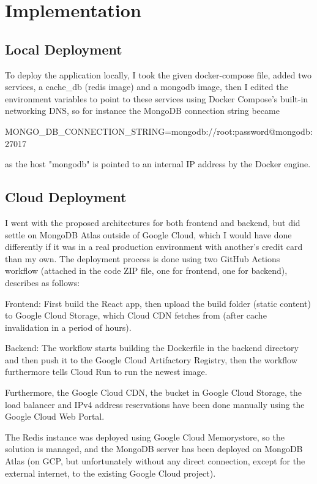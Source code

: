 \documentclass[11pt]{article}
\begin{document}
\section{Implementation}

\subsection{Local Deployment}
To deploy the application locally, I took the given docker-compose file, added two services, a cache\_db (redis image) and a mongodb image, then I edited the environment variables to point to these services using Docker Compose's built-in networking DNS, so for instance the MongoDB connection string became \begin{verbatim*}
	MONGO_DB_CONNECTION_STRING=mongodb://root:password@mongodb:27017
\end{verbatim*} as the host "mongodb" is pointed to an internal IP address by the Docker engine.

\subsection{Cloud Deployment}
I went with the proposed architectures for both frontend and backend, but did settle on MongoDB Atlas outside of Google Cloud, which I would have done differently if it was in a real production environment with another's credit card than my own. The deployment process is done using two GitHub Actions workflow (attached in the code ZIP file, one for frontend, one for backend), describes as follows:

Frontend: First build the React app, then upload the build folder (static content) to Google Cloud Storage, which Cloud CDN fetches from (after cache invalidation in a period of hours).

Backend: The workflow starts building the Dockerfile in the backend directory and then push it to the Google Cloud Artifactory Registry, then the workflow furthermore tells Cloud Run to run the newest image. 

Furthermore, the Google Cloud CDN, the bucket in Google Cloud Storage, the load balancer and IPv4 address reservations have been done manually using the Google Cloud Web Portal.

The Redis instance was deployed using Google Cloud Memorystore, so the solution is managed, and the MongoDB server has been deployed on MongoDB Atlas (on GCP, but unfortunately without any direct connection, except for the external internet, to the existing Google Cloud project).
\end{document}
